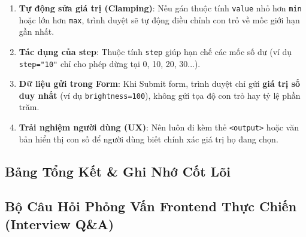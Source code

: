 \documentclass[11pt,oneside]{book}
\newcommand{\thd}[1]{\textcolor{white}{\textbf{\strut #1}}}
\newcommand{\codeinline}[1]{\textcolor{accentOrange}{\texttt{#1}}}
\begin{document}
\begin{tipBox}
\begin{enumerate}[leftmargin=1.5em, itemsep=2pt, parsep=0pt]
    \item \textbf{Tự động sửa giá trị (Clamping)}: Nếu gán thuộc tính \codeinline{value} nhỏ hơn \codeinline{min} hoặc lớn hơn \codeinline{max}, trình duyệt sẽ tự động điều chỉnh con trỏ về mốc giới hạn gần nhất.
    \item \textbf{Tác dụng của step}: Thuộc tính \codeinline{step} giúp hạn chế các mốc số dư (ví dụ \codeinline{step="10"} chỉ cho phép dừng tại 0, 10, 20, 30...).
    \item \textbf{Dữ liệu gửi trong Form}: Khi Submit form, trình duyệt chỉ gửi \textbf{giá trị số duy nhất} (ví dụ \codeinline{brightness=100}), không gửi tọa độ con trỏ hay tỷ lệ phần trăm.
    \item \textbf{Trải nghiệm người dùng (UX)}: Nên luôn đi kèm thẻ \codeinline{<output>} hoặc văn bản hiển thị con số để người dùng biết chính xác giá trị họ đang chọn.
\end{enumerate}
\end{tipBox}

\subsection{Bảng Tổng Kết \& Ghi Nhớ Cốt Lõi}

\begin{prettyTableBox}
\end{prettyTableBox}

\subsection{Bộ Câu Hỏi Phỏng Vấn Frontend Thực Chiến (Interview Q\&A)}
\end{document}
